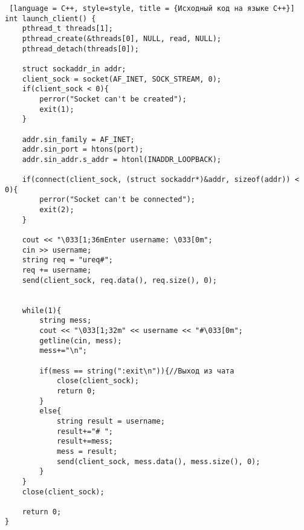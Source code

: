 \documentclass{article}
\begin{document}
\begin{lstlisting} [language = C++, style=style, title = {Исходный код на языке C++}]
int launch_client() {
    pthread_t threads[1];
    pthread_create(&threads[0], NULL, read, NULL);
    pthread_detach(threads[0]);

    struct sockaddr_in addr;
    client_sock = socket(AF_INET, SOCK_STREAM, 0);
    if(client_sock < 0){
        perror("Socket can't be created");
        exit(1);
    }

    addr.sin_family = AF_INET;
    addr.sin_port = htons(port);
    addr.sin_addr.s_addr = htonl(INADDR_LOOPBACK);

    if(connect(client_sock, (struct sockaddr*)&addr, sizeof(addr)) < 0){
        perror("Socket can't be connected");
        exit(2);
    }

    cout << "\033[1;36mEnter username: \033[0m";
    cin >> username;
    string req = "ureq#";
    req += username;
    send(client_sock, req.data(), req.size(), 0);


    while(1){
        string mess;
        cout << "\033[1;32m" << username << "#\033[0m";
        getline(cin, mess);
        mess+="\n";

        if(mess == string(":exit\n")){//Выход из чата
            close(client_sock);
            return 0;
        }
        else{
            string result = username;
            result+="# ";
            result+=mess;
            mess = result;
            send(client_sock, mess.data(), mess.size(), 0);
        }
    }
    close(client_sock);

    return 0;
}
	\end{lstlisting}
\end{document}
